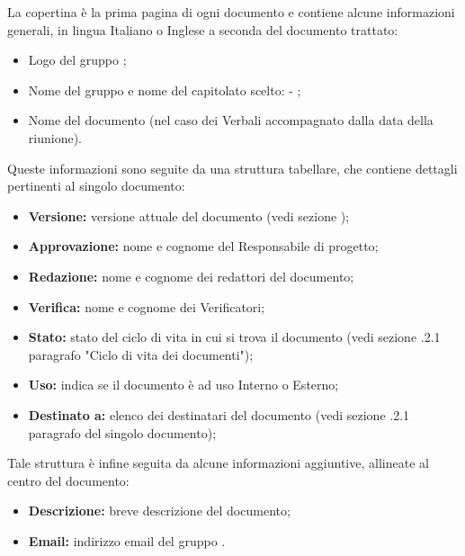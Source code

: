         La copertina è la prima pagina di ogni documento e contiene alcune informazioni generali, in lingua Italiano o Inglese a seconda del documento trattato:
        \begin{itemize}
          \item Logo del gruppo \Gruppo{};
          \item Nome del gruppo e nome del capitolato scelto: \Gruppo{} - \NomeProgetto{};
          \item Nome del documento (nel caso dei Verbali accompagnato dalla data della riunione).
        \end{itemize}
        Queste informazioni sono seguite da una struttura tabellare, che contiene dettagli pertinenti al singolo documento:
        \begin{itemize}
          \item \textbf{Versione:} versione attuale del documento (vedi sezione );%
          \item \textbf{Approvazione:} nome e cognome del Responsabile di progetto;
          \item \textbf{Redazione:} nome e cognome dei redattori del documento;
          \item \textbf{Verifica:} nome e cognome dei Verificatori;
          \item \textbf{Stato:} stato del ciclo di vita in cui si trova il documento (vedi sezione .2.1 paragrafo "Ciclo di vita dei documenti");
          \item \textbf{Uso:} indica se il documento è ad uso Interno o Esterno;
          \item \textbf{Destinato a:} elenco dei destinatari del documento (vedi sezione .2.1 paragrafo del singolo documento);
    	\end{itemize}
    	Tale struttura è infine seguita da alcune informazioni aggiuntive, allineate al centro del documento:
    	\begin{itemize}
          \item \textbf{Descrizione:} breve descrizione del documento;
          \item \textbf{Email:} indirizzo email del gruppo \Gruppo{}.
   		\end{itemize}

